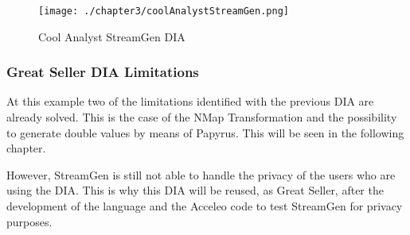 \begin{figure}
\centering
{\texttt{[image: ./chapter3/coolAnalystStreamGen.png]}}
\caption{Cool Analyst StreamGen DIA}
\label{fig:Cool Analyst StreamGen DIA}
\end{figure}

\subsubsection*{Great Seller DIA Limitations}

At this example two of the limitations identified with the previous DIA are already solved. This is the case of the NMap Transformation and the possibility to generate double values by means of Papyrus. This will be seen in the following chapter.

However, StreamGen is still not able to handle the privacy of the users who are using the DIA. This is why this DIA will be reused, as Great Seller, after the development of the language and the Acceleo code to test StreamGen for privacy purposes.

